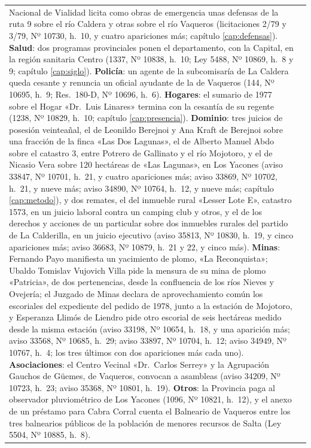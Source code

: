 \begin{longtable}{@{}p{2.7cm}p{10.3cm}@{}}
Nacional de Vialidad licita como obras de emergencia unas defensas de la ruta 9 sobre el río Caldera y otras sobre el río Vaqueros (licitaciones 2/79 y 3/79, Nº 10730, h.\ 10, y cuatro apariciones más; capítulo \ref{cap:defensas}). \textbf{Salud}: dos programas provinciales ponen el departamento, con la Capital, en la región sanitaria Centro (1337, Nº 10838, h.\ 10; Ley 5488, Nº 10869, h.\ 8 y 9; capítulo \ref{cap:siglo}). \textbf{Policía}: un agente de la subcomisaría de La Caldera queda cesante y renuncia un oficial ayudante de la de Vaqueros (144, Nº 10695, h.\ 9; Res.\ 180-D, Nº 10696, h.\ 6). \textbf{Hogares}: el sumario de 1977 sobre el Hogar «Dr.\ Luis Linares» termina con la cesantía de su regente (1238, Nº 10829, h.\ 10; capítulo \ref{cap:presencia}). \textbf{Dominio}: tres juicios de posesión veinteañal, el de Leonildo Berejnoi y Ana Kraft de Berejnoi sobre una fracción de la finca «Las Dos Lagunas», el de Alberto Manuel Abdo sobre el catastro 3, entre Potrero de Gallinato y el río Mojotoro, y el de Nicasio Vera sobre 120 hectáreas de «Las Lagunas», en Los Yacones (aviso 33847, Nº 10701, h.\ 21, y cuatro apariciones más; aviso 33869, Nº 10702, h.\ 21, y nueve más; aviso 34890, Nº 10764, h.\ 12, y nueve más; capítulo \ref{cap:metodo}), y dos remates, el del inmueble rural «Lesser Lote E», catastro 1573, en un juicio laboral contra un camping club y otros, y el de los derechos y acciones de un particular sobre dos inmuebles rurales del partido de La Calderilla, en un juicio ejecutivo (aviso 35813, Nº 10830, h.\ 19, y cinco apariciones más; aviso 36683, Nº 10879, h.\ 21 y 22, y cinco más). \textbf{Minas}: Fernando Payo manifiesta un yacimiento de plomo, «La Reconquista»; Ubaldo Tomislav Vujovich Villa pide la mensura de su mina de plomo «Patricia», de dos pertenencias, desde la confluencia de los ríos Nieves y Ovejería; el Juzgado de Minas declara de aprovechamiento común los escoriales del expediente del pedido de 1978, junto a la estación de Mojotoro, y Esperanza Llimós de Liendro pide otro escorial de seis hectáreas medido desde la misma estación (aviso 33198, Nº 10654, h.\ 18, y una aparición más; aviso 33568, Nº 10685, h.\ 29; aviso 33897, Nº 10704, h.\ 12; aviso 34949, Nº 10767, h.\ 4; los tres últimos con dos apariciones más cada uno). \textbf{Asociaciones}: el Centro Vecinal «Dr.\ Carlos Serrey» y la Agrupación Gauchos de Güemes, de Vaqueros, convocan a asambleas (aviso 34209, Nº 10723, h.\ 23; aviso 35368, Nº 10801, h.\ 19). \textbf{Otros}: la Provincia paga al observador pluviométrico de Los Yacones (1096, Nº 10821, h.\ 12), y el anexo de un préstamo para Cabra Corral cuenta el Balneario de Vaqueros entre los tres balnearios públicos de la población de menores recursos de Salta (Ley 5504, Nº 10885, h.\ 8). \\

\end{longtable}
